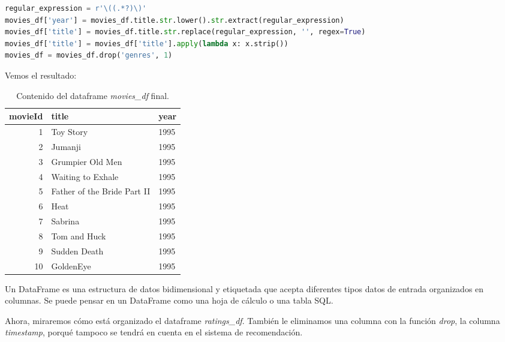\documentclass{uimppracticas}
\begin{document}
\begin{lstlisting}[language=python, basicstyle=\small]
regular_expression = r'\((.*?)\)'
movies_df['year'] = movies_df.title.str.lower().str.extract(regular_expression)
movies_df['title'] = movies_df.title.str.replace(regular_expression, '', regex=True)
movies_df['title'] = movies_df['title'].apply(lambda x: x.strip())
movies_df = movies_df.drop('genres', 1)
\end{lstlisting}

Vemos el resultado:

\begin{table}[H]
	\centering
	\begin{tabular}{rll}
		\toprule
		movieId &                  title &  year \\
		\midrule
		1 &                    Toy Story &  1995 \\
		2 &                      Jumanji &  1995 \\
		3 &             Grumpier Old Men &  1995 \\
		4 &            Waiting to Exhale &  1995 \\
		5 &  Father of the Bride Part II &  1995 \\
		6 &                         Heat &  1995 \\
		7 &                      Sabrina &  1995 \\
		8 &                 Tom and Huck &  1995 \\
		9 &                 Sudden Death &  1995 \\
		10 &                    GoldenEye &  1995 \\
		\bottomrule
	\end{tabular}
	\caption{Contenido del dataframe \textit{movies\_df} final.}
	\label{movies_df_final}
\end{table}

\begin{definition}\label{dataframe}
	Un DataFrame es una estructura de datos bidimensional y etiquetada que acepta diferentes tipos datos de entrada organizados en columnas. Se puede pensar en un DataFrame como una hoja de cálculo o una tabla SQL.
\end{definition}

\newpage

Ahora, miraremos cómo está organizado el dataframe \textit{ratings\_df}. También le eliminamos una columna con la función \textit{drop}, la columna \textit{timestamp}, porqué tampoco se tendrá en cuenta en el sistema de recomendación.
\end{document}
